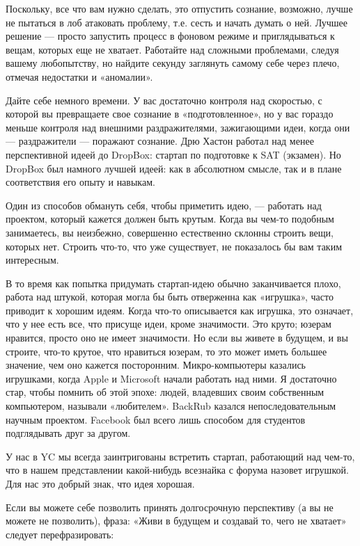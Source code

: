 \documentclass[ebook,12pt,oneside,openany]{memoir}
\begin{document}
Поскольку, все что вам нужно сделать, это отпустить сознание,
возможно, лучше не пытаться в лоб атаковать проблему, т.е. сесть и
начать думать о ней. Лучшее решение — просто запустить процесс в
фоновом режиме и приглядываться к вещам, которых еще не хватает.
Работайте над сложными проблемами, следуя вашему любопытству, но
найдите секунду заглянуть самому себе через плечо, отмечая недостатки
и «аномалии».

Дайте себе немного времени. У вас достаточно контроля над скоростью, с
которой вы превращаете свое сознание в «подготовленное», но у вас
гораздо меньше контроля над внешними раздражителями, зажигающими идеи,
когда они — раздражители — поражают сознание. Дрю Хастон работал над
менее перспективной идеей до DropBox: стартап по подготовке к SAT
(экзамен). Но DropBox был намного лучшей идеей: как в абсолютном
смысле, так и в плане соответствия его опыту и навыкам.

Один из способов обмануть себя, чтобы приметить идею, — работать над
проектом, который кажется должен быть крутым. Когда вы чем-то подобным
занимаетесь, вы неизбежно, совершенно естественно склонны строить
вещи, которых нет. Строить что-то, что уже существует, не показалось
бы вам таким интересным.

В то время как попытка придумать стартап-идею обычно заканчивается
плохо, работа над штукой, которая могла бы быть отверженна как
«игрушка», часто приводит к хорошим идеям. Когда что-то описывается
как игрушка, это означает, что у нее есть все, что присуще идеи, кроме
значимости. Это круто; юзерам нравится, просто оно не имеет
значимости. Но если вы живете в будущем, и вы строите, что-то крутое,
что нравиться юзерам, то это может иметь большее значение, чем оно
кажется посторонним. Микро-компьютеры казались игрушками, когда Apple
и Microsoft начали работать над ними. Я достаточно стар, чтобы помнить
об этой эпохе: людей, владевших своим собственным компьютером,
называли «любителем». BackRub казался непоследовательным научным
проектом. Facebook был всего лишь способом для студентов подглядывать
друг за другом.

У нас в YC мы всегда заинтригованы встретить стартап, работающий над
чем-то, что в нашем представлении какой-нибудь всезнайка с форума
назовет игрушкой. Для нас это добрый знак, что идея хорошая.

Если вы можете себе позволить принять долгосрочную перспективу (а вы
не можете не позволить), фраза: «Живи в будущем и создавай то, чего не
хватает» следует перефразировать:
\end{document}
